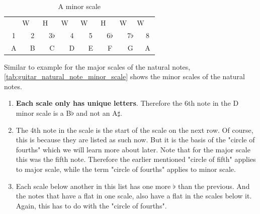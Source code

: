 \begin{table}[h]
	\centering
	\begin{tabular}{*{16}{c}}
		& \multicolumn{2}{P{4mm}}{\large{W}} & \multicolumn{2}{P{4mm}}{\large{H}} & \multicolumn{2}{P{4mm}}{\large{W}} & \multicolumn{2}{P{4mm}}{\large{W}} & \multicolumn{2}{P{4mm}}{\large{H}} & \multicolumn{2}{P{4mm}}{\large{W}} & \multicolumn{2}{P{4mm}}{\large{W}} & \\
		\multicolumn{2}{P{4mm}}{1} & \multicolumn{2}{P{4mm}}{2} & \multicolumn{2}{P{4mm}}{3$\flat$} & \multicolumn{2}{P{4mm}}{4} & \multicolumn{2}{P{4mm}}{5} & \multicolumn{2}{P{4mm}}{6$\flat$} & \multicolumn{2}{P{4mm}}{7$\flat$} & \multicolumn{2}{P{4mm}}{8} \\
		\multicolumn{2}{P{4mm}}{A} & \multicolumn{2}{P{4mm}}{B} & \multicolumn{2}{P{4mm}}{C} & \multicolumn{2}{P{4mm}}{D} & \multicolumn{2}{P{4mm}}{E} & \multicolumn{2}{P{4mm}}{F} & \multicolumn{2}{P{4mm}}{G} & \multicolumn{2}{P{4mm}}{A}
	\end{tabular}
	\caption{A minor scale}
	\label{tab:guitar_a_minor_scale}
\end{table}

Similar to example for the major scales of the natural notes, \autoref{tab:guitar_natural_note_minor_scale} shows the minor scales of the natural notes.

\begin{enumerate}
	\item \textbf{Each scale only has unique letters}. Therefore the 6th note in the D minor scale is a B$\flat$ and not an A$\sharp$.
	\item The 4th note in the scale is the start of the scale on the next row. Of course, this is because they are listed as such now. But it is the basis of the "circle of fourths" which we will learn more about later. Note that for the major scale this was the fifth note. Therefore the earlier mentioned "circle of fifth" applies to major scale, while the term "circle of fourths" applies to minor scale.
	\item Each scale below another in this list has one more $\flat$ than the previous. And the notes that have a flat in one scale, also have a flat in the scales below it. Again, this has to do with the "circle of fourths".
\end{enumerate}

